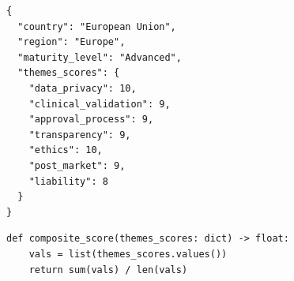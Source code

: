 
\begin{lstlisting}[caption={Illustrative JSON country record fields},label=lst:json]
{
  "country": "European Union",
  "region": "Europe",
  "maturity_level": "Advanced",
  "themes_scores": {
    "data_privacy": 10,
    "clinical_validation": 9,
    "approval_process": 9,
    "transparency": 9,
    "ethics": 10,
    "post_market": 9,
    "liability": 8
  }
}
\end{lstlisting}

\begin{lstlisting}[caption={Composite score computation (conceptual)},label=lst:score]
def composite_score(themes_scores: dict) -> float:
    vals = list(themes_scores.values())
    return sum(vals) / len(vals)
\end{lstlisting}
